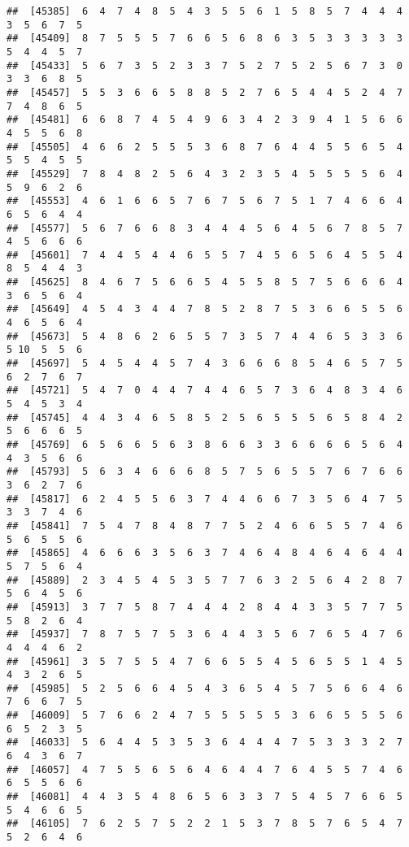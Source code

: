 \documentclass[
]{book}
\begin{document}
\begin{verbatim}
##  [45385]  6  4  7  4  8  5  4  3  5  5  6  1  5  8  5  7  4  4  4  3  5  6  7  5
##  [45409]  8  7  5  5  5  7  6  6  5  6  8  6  3  5  3  3  3  3  3  5  4  4  5  7
##  [45433]  5  6  7  3  5  2  3  3  7  5  2  7  5  2  5  6  7  3  0  3  3  6  8  5
##  [45457]  5  5  3  6  6  5  8  8  5  2  7  6  5  4  4  5  2  4  7  7  4  8  6  5
##  [45481]  6  6  8  7  4  5  4  9  6  3  4  2  3  9  4  1  5  6  6  4  5  5  6  8
##  [45505]  4  6  6  2  5  5  5  3  6  8  7  6  4  4  5  5  6  5  4  5  5  4  5  5
##  [45529]  7  8  4  8  2  5  6  4  3  2  3  5  4  5  5  5  5  6  4  5  9  6  2  6
##  [45553]  4  6  1  6  6  5  7  6  7  5  6  7  5  1  7  4  6  6  4  6  5  6  4  4
##  [45577]  5  6  7  6  6  8  3  4  4  4  5  6  4  5  6  7  8  5  7  4  5  6  6  6
##  [45601]  7  4  4  5  4  4  6  5  5  7  4  5  6  5  6  4  5  5  4  8  5  4  4  3
##  [45625]  8  4  6  7  5  6  6  5  4  5  5  8  5  7  5  6  6  6  4  3  6  5  6  4
##  [45649]  4  5  4  3  4  4  7  8  5  2  8  7  5  3  6  6  5  5  6  4  6  5  6  4
##  [45673]  5  4  8  6  2  6  5  5  7  3  5  7  4  4  6  5  3  3  6  5 10  5  5  6
##  [45697]  5  4  5  4  4  5  7  4  3  6  6  6  8  5  4  6  5  7  5  6  2  7  6  7
##  [45721]  5  4  7  0  4  4  7  4  4  6  5  7  3  6  4  8  3  4  6  5  4  5  3  4
##  [45745]  4  4  3  4  6  5  8  5  2  5  6  5  5  5  6  5  8  4  2  5  6  6  6  5
##  [45769]  6  5  6  6  5  6  3  8  6  6  3  3  6  6  6  6  5  6  4  4  3  5  6  6
##  [45793]  5  6  3  4  6  6  6  8  5  7  5  6  5  5  7  6  7  6  6  3  6  2  7  6
##  [45817]  6  2  4  5  5  6  3  7  4  4  6  6  7  3  5  6  4  7  5  3  3  7  4  6
##  [45841]  7  5  4  7  8  4  8  7  7  5  2  4  6  6  5  5  7  4  6  5  6  5  5  6
##  [45865]  4  6  6  6  3  5  6  3  7  4  6  4  8  4  6  4  6  4  4  5  7  5  6  4
##  [45889]  2  3  4  5  4  5  3  5  7  7  6  3  2  5  6  4  2  8  7  5  6  4  5  6
##  [45913]  3  7  7  5  8  7  4  4  4  2  8  4  4  3  3  5  7  7  5  5  8  2  6  4
##  [45937]  7  8  7  5  7  5  3  6  4  4  3  5  6  7  6  5  4  7  6  4  4  4  6  2
##  [45961]  3  5  7  5  5  4  7  6  6  5  5  4  5  6  5  5  1  4  5  4  3  2  6  5
##  [45985]  5  2  5  6  6  4  5  4  3  6  5  4  5  7  5  6  6  4  6  7  6  6  7  5
##  [46009]  5  7  6  6  2  4  7  5  5  5  5  5  3  6  6  5  5  5  6  6  5  2  3  5
##  [46033]  5  6  4  4  5  3  5  3  6  4  4  4  7  5  3  3  3  2  7  6  4  3  6  7
##  [46057]  4  7  5  5  6  5  6  4  6  4  4  7  6  4  5  5  7  4  6  6  5  5  6  6
##  [46081]  4  4  3  5  4  8  6  5  6  3  3  7  5  4  5  7  6  6  5  5  4  6  6  5
##  [46105]  7  6  2  5  7  5  2  2  1  5  3  7  8  5  7  6  5  4  7  5  2  6  4  6

\end{verbatim}
\end{document}
